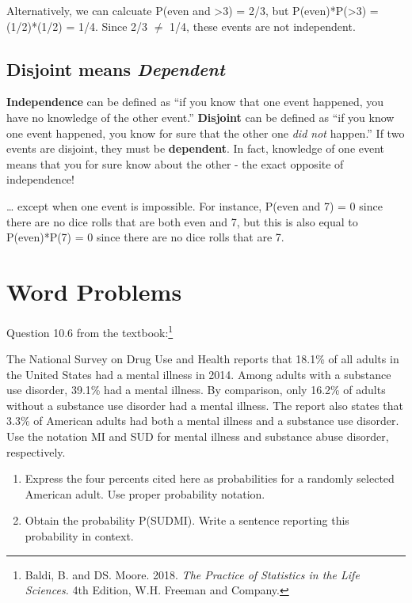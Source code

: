 \documentclass[
  letterpaper,
  DIV=11,
  numbers=noendperiod,
  oneside]{scrreprt}
\providecommand{\tightlist}{%
  \setlength{\itemsep}{0pt}\setlength{\parskip}{0pt}}\usepackage{longtable,booktabs,array}
\begin{document}
Alternatively, we can calcuate P(even and \textgreater3) = 2/3, but
P(even)*P(\textgreater3) = (1/2)*(1/2) = 1/4. Since 2/3 \(\ne\) 1/4,
these events are not independent.

\hypertarget{disjoint-means-dependent}{%
\subsection{\texorpdfstring{Disjoint means
\emph{Dependent}}{Disjoint means Dependent}}\label{disjoint-means-dependent}}

\textbf{Independence} can be defined as ``if you know that one event
happened, you have no knowledge of the other event.'' \textbf{Disjoint}
can be defined as ``if you know one event happened, you know for sure
that the other one \emph{did not} happen.'' If two events are disjoint,
they must be \textbf{dependent}. In fact, knowledge of one event means
that you for sure know about the other - the exact opposite of
independence!

\ldots{} except when one event is impossible. For instance, P(even and
7) = 0 since there are no dice rolls that are both even and 7, but this
is also equal to P(even)*P(7) = 0 since there are no dice rolls that are
7.

\hypertarget{word-problems}{%
\section{Word Problems}\label{word-problems}}

Question 10.6 from the textbook:\footnote{Baldi, B. and DS. Moore. 2018.
  \emph{The Practice of Statistics in the Life Sciences.} 4th Edition,
  W.H. Freeman and Company.}

The National Survey on Drug Use and Health reports that 18.1\% of all
adults in the United States had a mental illness in 2014. Among adults
with a substance use disorder, 39.1\% had a mental illness. By
comparison, only 16.2\% of adults without a substance use disorder had a
mental illness. The report also states that 3.3\% of American adults had
both a mental illness and a substance use disorder. Use the notation MI
and SUD for mental illness and substance abuse disorder, respectively.

\begin{enumerate}
\def\labelenumi{\alph{enumi}.}
\tightlist
\item
  Express the four percents cited here as probabilities for a randomly
  selected American adult. Use proper probability notation.
\item
  Obtain the probability P(SUD\textbar MI). Write a sentence reporting
  this probability in context.
\end{enumerate}
\end{document}
